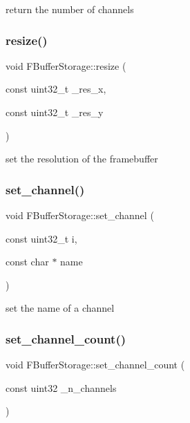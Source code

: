 return the number of channels \mbox{\label{struct_f_buffer_storage_a026cdc839ecd1ae6e63c390832e1290d}} 
\subsubsection{\texorpdfstring{resize()}{resize()}}
{\footnotesize\ttfamily void F\+Buffer\+Storage\+::resize (\begin{DoxyParamCaption}\item[{const uint32\+\_\+t}]{\+\_\+res\+\_\+x,  }\item[{const uint32\+\_\+t}]{\+\_\+res\+\_\+y }\end{DoxyParamCaption})\hspace{0.3cm}{\ttfamily [inline]}}

set the resolution of the framebuffer \mbox{\label{struct_f_buffer_storage_a6996d5c41b3201156b7fa6f845007bad}} 
\subsubsection{\texorpdfstring{set\+\_\+channel()}{set\_channel()}}
{\footnotesize\ttfamily void F\+Buffer\+Storage\+::set\+\_\+channel (\begin{DoxyParamCaption}\item[{const uint32\+\_\+t}]{i,  }\item[{const char $\ast$}]{name }\end{DoxyParamCaption})\hspace{0.3cm}{\ttfamily [inline]}}

set the name of a channel \mbox{\label{struct_f_buffer_storage_aa42c75b3dbc7cbe99d0ab6a9a49f179b}} 
\subsubsection{\texorpdfstring{set\+\_\+channel\+\_\+count()}{set\_channel\_count()}}
{\footnotesize\ttfamily void F\+Buffer\+Storage\+::set\+\_\+channel\+\_\+count (\begin{DoxyParamCaption}\item[{const uint32}]{\+\_\+n\+\_\+channels }\end{DoxyParamCaption})\hspace{0.3cm}{\ttfamily [inline]}}

